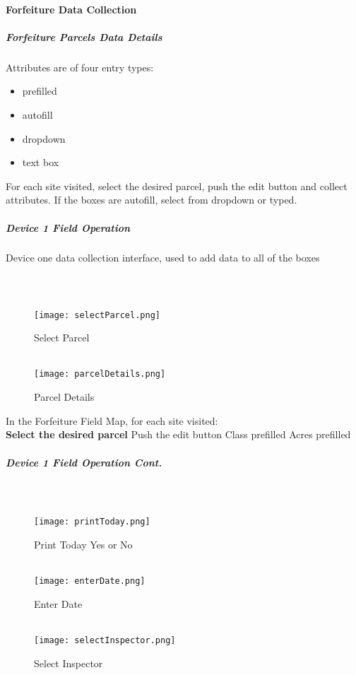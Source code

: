 \documentclass[class=article , crop=false, titlepage, twoside, multi={itemize, figure, verbatim}, float=false]{standalone}
\begin{document}
\paragraph{Forfeiture Data Collection}
\subparagraph{Forfeiture Parcels Data Details}
Attributes are of four entry types:\begin{itemize}
\item prefilled
\item autofill
\item dropdown
\item text box \end{itemize}
For each site visited, select the desired parcel, push the edit button and collect attributes.  If the boxes are autofill, select from dropdown or typed.\bigskip 
\clearpage
\subparagraph{Device 1 Field Operation}Device one data collection interface, used to add data to all of the boxes
\subparagraph*{\\}
\begin{wrapfigure}{r}{0.5\textwidth}
\centering
\texttt{[image: selectParcel.png]}
\caption {Select Parcel}
\vspace{.25in}
\HRule \\[.4cm] %
\vspace{.25in}
\texttt{[image: parcelDetails.png]}
\caption{Parcel Details}
\end{wrapfigure}
\vspace{1in}
In the Forfeiture Field Map, for each site visited:\\
\vspace{1in}
\textbf{Select the desired parcel}
\vspace{3in}
Push the \Large edit button 
\clearpage
Class prefilled
Acres prefilled
\clearpage
\subparagraph*{Device 1 Field Operation Cont.}
\subparagraph*{\\}
\begin{wrapfigure}{r}{0.5\textwidth}
\centering
\texttt{[image: printToday.png]}
\caption {Print Today Yes or No}
\vspace{.2in}
\HRule \\[.4cm] %
\vspace{.2in}
\texttt{[image: enterDate.png]}
\caption{Enter Date}
\vspace{.2in}
\HRule \\[.4cm] %
\vspace{.2in}
\texttt{[image: selectInspector.png]}
\caption{Select Inspector}
\end{wrapfigure}
\end{document}
